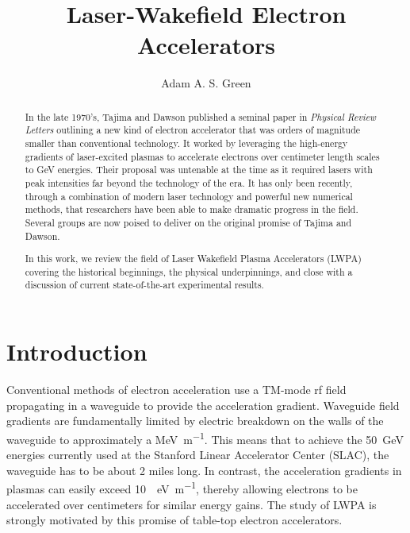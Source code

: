 \documentclass[12pt,letter]{article}
\title{Laser-Wakefield Electron Accelerators}
\author{Adam A. S. Green}
\affil{\small Department of Physics, University of Colorado at Boulder}
\begin{document}

\maketitle
\doublespacing
\strictpagecheck
\begin{abstract}
    In the late 1970's, Tajima and Dawson published a seminal paper in {\em
    Physical Review Letters} outlining a new kind of electron
    accelerator that was orders of magnitude smaller than conventional
    technology. It
    worked by
    leveraging the high-energy gradients of
    laser-excited plasmas to accelerate electrons over centimeter length scales to \si{\giga\electronvolt}
    energies. Their proposal was untenable at the time as it
    required lasers with peak intensities far beyond the technology of the era.
    It has only been recently, through a combination of modern laser technology and powerful new
    numerical methods, that researchers have been able to make dramatic
    progress in the field. Several groups are now poised to deliver on the
 original promise of Tajima and Dawson.
    
    In this work, we review the field of Laser Wakefield Plasma Accelerators
    (LWPA) covering the historical beginnings, the physical underpinnings,
    and close with a discussion of current state-of-the-art
    experimental results. 

  \end{abstract}
\tableofcontents
\section{Introduction}
\label{sec:intro}
Conventional methods of electron acceleration use a TM-mode rf field
propagating in a
waveguide to provide the acceleration gradient. Waveguide field gradients are
fundamentally limited by electric breakdown on the walls of the waveguide to
approximately a
\si{\mega\electronvolt\per\meter}\cite{wang1997field}. This means that to achieve the
\SI{50}{\giga\electronvolt} energies currently used at the Stanford Linear
Accelerator Center
(SLAC)\cite{cornacchia2000coherent}, the waveguide has to be about 2 miles long. In contrast, the
acceleration gradients in plasmas can easily exceed \SI{10}{\giga
\electronvolt\per\meter}, thereby allowing electrons to be accelerated over centimeters
for similar energy gains\cite{RevModPhys.81.1229}.
The study of LWPA is strongly motivated by this promise of table-top electron
accelerators.   
\end{document}
